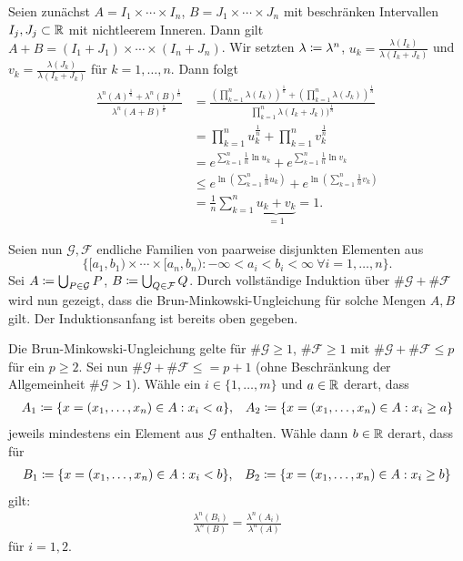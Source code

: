\documentclass[a4paper,twoside,DIV15,BCOR12mm]{scrbook}
\begin{document}
\begin{beweis}
Seien zunächst $A=I_1\times \cdots \times I_n$, $B=J_1\times\cdots\times J_n$ mit beschränken Intervallen $I_j,J_j\subset\mathbb{R}$ mit nichtleerem Inneren. Dann gilt
$A + B = (I_1 + J_1) \times \cdots \times (I_n + J_n)$. Wir setzten $\lambda \da \lambda^n$, $u_k = \frac{\lambda(I_k)}{\lambda(I_k + J_k)}$ und $v_k = \frac{\lambda(J_k)}{\lambda(I_k + J_k)}$ für $k=1,\ldots,n$. Dann folgt
\begin{align*}
\frac{\lambda^n(A)^{\frac1n} + \lambda^n(B)^{\frac1n}}{\lambda^n(A+B)^{\frac1n}}
&= \frac{(\prod_{k=1}^n \lambda(I_k))^{\frac1n} + (\prod_{k=1}^n \lambda(J_k))^{\frac1n}}{\prod_{k=1}^n \lambda(I_k+J_k))^{\frac1n}} \\
&=\prod_{k=1}^n u_k^{\frac1n} + \prod_{k=1}^n v_k^{\frac1n} \\
&= e^{\sum_{k=1}^n \frac1n \ln u_k} + e^{\sum_{k=1}^n \frac1n \ln v_k} \\
&\le e^{\ln(\sum_{k=1}^n \frac1n u_k)} + e^{\ln(\sum_{k=1}^n \frac1n v_k)}\\
&= \frac1n \sum_{k=1}^n \underbrace{u_k + v_k}_{=1} = 1.
\end{align*}

Seien nun $\mathcal G, \mathcal F$ endliche Familien von paarweise disjunkten Elementen aus
\[
\{ [a_1,b_1) \times \cdots \times [a_n,b_n) : -\infty < a_i < b_i < \infty \ \forall i=1,\ldots,n\}.
\]
Sei $A \da \bigcup_{P\in\mathcal G}P$, $B\da\bigcup_{Q\in\mathcal F}Q$. Durch vollständige Induktion über $\#\mathcal G + \#\mathcal F$ wird nun gezeigt, dass die Brun-Minkowski-Ungleichung für solche Mengen $A,B$ gilt. Der Induktionsanfang ist bereits oben gegeben.

Die Brun-Minkowski-Ungleichung gelte für $\#\mathcal G\ge 1$, $\#\mathcal F\ge 1$ mit $\#\mathcal G + \#\mathcal F \le p$ für ein $p\ge 2$. Sei nun $\#\mathcal G + \#\mathcal F \le = p+1$ (ohne Beschränkung der Allgemeinheit $\#\mathcal G>1$). Wähle ein $i\in\{1,\ldots,m\}$ und $a\in\mathbb{R}$ derart, dass 
\begin{align*}
A_1 \da \{x = (x_1,\dots,x_n)\in A : x_i < a\}, &&
A_2 \da \{x = (x_1,\dots,x_n)\in A : x_i \ge a\}
\end{align*}
jeweils mindestens ein Element aus $\mathcal G$ enthalten. Wähle dann $b\in\mathbb{R}$ derart, dass für
\begin{align*}
B_1 \da \{x = (x_1,\dots,x_n)\in A : x_i < b\}, && 
B_2 \da \{x = (x_1,\dots,x_n)\in A : x_i \ge b\}
\end{align*}
gilt:
\begin{align*}
\frac{\lambda^n(B_i)}{\lambda^n(B)} = \frac{\lambda^n(A_i)}{\lambda^n(A)}
\end{align*}
für $i=1,2$.


\end{beweis}
\end{document}
